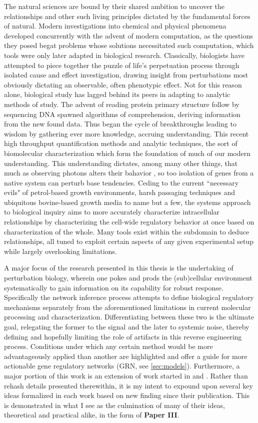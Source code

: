 The natural sciences are bound by their shared ambition to uncover the relationships and other such living principles dictated by the fundamental forces of natural. Modern investigations into chemical and physical phenomena developed concurrently with the advent of modern computation, as the questions they posed begat problems whose solutions necessitated such computation, which tools were only later adapted in biological research. Classically, biologists have attempted to piece together the puzzle of life's perpetuation process through isolated cause and effect investigation, drawing insight from perturbations most obviously dictating an observable, often phenotypic effect. Not for this reason alone, biological study has lagged behind its peers in adapting to analytic methods of study. The advent of reading protein primary structure follow by sequencing DNA spawned algorithms of comprehension, deriving information from the new found data. Thus began the cycle of breakthroughs leading to wisdom by gathering ever more knowledge, \ie accruing understanding. This recent high throughput quantification methods and analytic techniques, the sort of biomolecular characterization which form the foundation of much of our modern understanding. This understanding dictates, among many other things, that much as observing photons alters their bahavior \citep{young1832bakerian}, so too isolation of genes from a native system can perturb base tendencies. Ceding to the current ``necessary evils" of petrol-based growth environments, harsh passaging techniques and ubiquitous bovine-based growth media to name but a few, the systems approach to biological inquiry aims to more accurately characterize intracellular relationships by characterizing the cell-wide regulatory behavior at once based on characterization of the whole. Many tools exist within the subdomain to deduce relationships, all tuned to exploit certain aspects of any given experimental setup while largely overlooking limitations.

A major focus of the research presented in this thesis is the undertaking of perturbation biology, wherein one pokes and prods the (sub)cellular environment systematically to gain information on its capability for robust response. Specifically the network inference process attempts to define biological regulatory mechanisms separately from the aforementioned limitations in current molecular processing and characterization. Differentiating between these two is the ultimate goal, relegating the former to the signal and the later to systemic noise, thereby defining and hopefully limiting the role of artifacts in this reverse engineering process. Conditions under which any certain method would be more advantageously applied than another are highlighted and offer a guide for more actionable gene regulatory networks (GRN, see \cref{sec:models}). Furthermore, a major portion of this work is an extension of work started in \cite{Nordling2013} and \cite{Tjarnberg2015etb}. Rather than rehash details presented therewithin, it is my intent to expound upon several key ideas formalized in each work based on new finding since their publication. This is demonstrated in what I see as the culmination of many of their ideas, theoretical and practical alike, in the form of \textbf{Paper III}.


